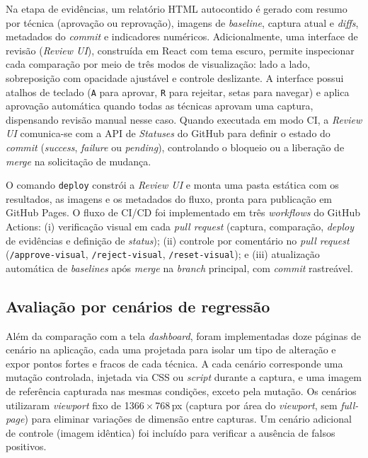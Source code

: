 \documentclass{UNESC}
\begin{document}
Na etapa de evidências, um relatório HTML autocontido é gerado com resumo por técnica (aprovação ou reprovação), imagens de \emph{baseline}, captura atual e \emph{diffs}, metadados do \emph{commit} e indicadores numéricos. Adicionalmente, uma interface de revisão (\emph{Review UI}), construída em React com tema escuro, permite inspecionar cada comparação por meio de três modos de visualização: lado a lado, sobreposição com opacidade ajustável e controle deslizante. A interface possui atalhos de teclado (\texttt{A} para aprovar, \texttt{R} para rejeitar, setas para navegar) e aplica aprovação automática quando todas as técnicas aprovam uma captura, dispensando revisão manual nesse caso. Quando executada em modo CI, a \emph{Review UI} comunica-se com a API de \emph{Statuses} do GitHub para definir o estado do \emph{commit} (\emph{success}, \emph{failure} ou \emph{pending}), controlando o bloqueio ou a liberação de \emph{merge} na solicitação de mudança.

O comando \texttt{deploy} constrói a \emph{Review UI} e monta uma pasta estática com os resultados, as imagens e os metadados do fluxo, pronta para publicação em GitHub Pages. O fluxo de CI/CD foi implementado em três \emph{workflows} do GitHub Actions: (i) verificação visual em cada \emph{pull request} (captura, comparação, \emph{deploy} de evidências e definição de \emph{status}); (ii) controle por comentário no \emph{pull request} (\texttt{/approve-visual}, \texttt{/reject-visual}, \texttt{/reset-visual}); e (iii) atualização automática de \emph{baselines} após \emph{merge} na \emph{branch} principal, com \emph{commit} rastreável.


\subsection{Avaliação por cenários de regressão}
Além da comparação com a tela \textit{dashboard}, foram implementadas doze páginas de cenário na aplicação, cada uma projetada para isolar um tipo de alteração e expor pontos fortes e fracos de cada técnica. A cada cenário corresponde uma mutação controlada, injetada via CSS ou \emph{script} durante a captura, e uma imagem de referência capturada nas mesmas condições, exceto pela mutação. Os cenários utilizaram \emph{viewport} fixo de 1366\,$\times$\,768\,px (captura por área do \emph{viewport}, sem \emph{full-page}) para eliminar variações de dimensão entre capturas. Um cenário adicional de controle (imagem idêntica) foi incluído para verificar a ausência de falsos positivos.
\end{document}
